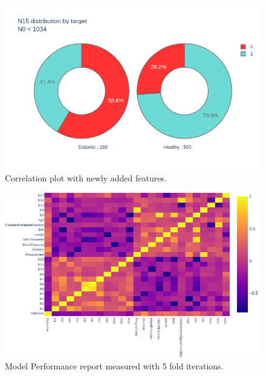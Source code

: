 \documentclass[12pt]{article}
\begin{document}
\begin{figure}[ht]
\centering
\includegraphics[width=1\textwidth]{newplot(41).png}
\caption{Correlation plot with newly added features.}
\end{figure}

\begin{figure}[ht]
\centering
\includegraphics[width=1\textwidth]{newplot(42).png}
\caption{Model Performance report measured with 5 fold iterations.}
\end{figure}
\end{document}
